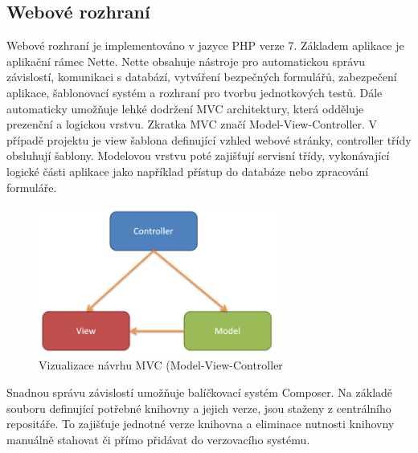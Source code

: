 \documentclass[thesis=B,czech]{FITthesis}[2012/06/26]
\begin{document}
\subsection{Webové rozhraní}
Webové rozhraní je implementováno v jazyce PHP verze 7. Základem aplikace je aplikační rámec Nette\cite{nette}. Nette
obsahuje nástroje pro automatickou správu závislostí, komunikaci s databází, vytváření bezpečných formulářů, zabezpečení
aplikace, šablonovací systém a rozhraní pro tvorbu jednotkových testů. Dále automaticky umožňuje lehké dodržení MVC architektury, která odděluje
prezenční a logickou vrstvu. Zkratka MVC značí Model-View-Controller. V případě projektu je view šablona definující vzhled webové stránky,
controller třídy obsluhují šablony. Modelovou vrstvu poté zajišťují servisní třídy, vykonávající logické části aplikace jako 
například přístup do databáze nebo zpracování formuláře.

\begin{figure}[h]\centering
 	\includegraphics[width=0.7\textwidth]{resources/mvc}
	\caption[MVC]{Vizualizace návrhu MVC (Model-View-Controller}\label{fig:mvc}
\end{figure}
\par
Snadnou správu závislostí umožňuje balíčkovací systém Composer\cite{composer}. 
Na základě souboru definující potřebné knihovny a jejich verze, jsou staženy z centrálního repositáře. To zajišťuje jednotné verze knihovna
a eliminace nutnosti knihovny manuálně stahovat či přímo přidávat do verzovacího systému.
\end{document}
